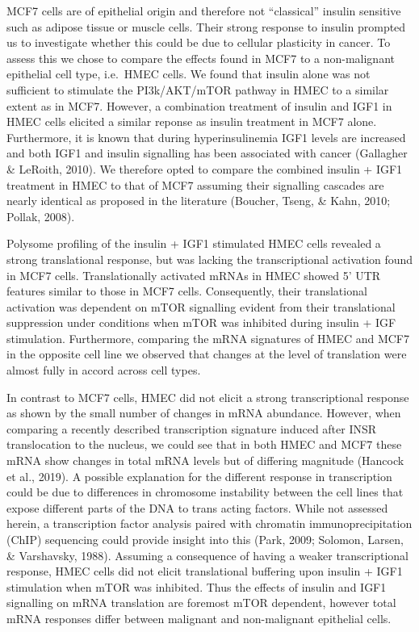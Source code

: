 \documentclass[
  12pt,
  openany]{book}
\begin{document}
MCF7 cells are of epithelial origin and therefore not ``classical'' insulin sensitive such as adipose tissue or muscle cells. Their strong response to insulin prompted us to investigate whether this could be due to cellular plasticity in cancer. To assess this we chose to compare the effects found in MCF7 to a non-malignant epithelial cell type, i.e.~HMEC cells. We found that insulin alone was not sufficient to stimulate the PI3k/AKT/mTOR pathway in HMEC to a similar extent as in MCF7. However, a combination treatment of insulin and IGF1 in HMEC cells elicited a similar reponse as insulin treatment in MCF7 alone. Furthermore, it is known that during hyperinsulinemia IGF1 levels are increased and both IGF1 and insulin signalling has been associated with cancer (Gallagher \& LeRoith, 2010). We therefore opted to compare the combined insulin + IGF1 treatment in HMEC to that of MCF7 assuming their signalling cascades are nearly identical as proposed in the literature (Boucher, Tseng, \& Kahn, 2010; Pollak, 2008).

Polysome profiling of the insulin + IGF1 stimulated HMEC cells revealed a strong translational response, but was lacking the transcriptional activation found in MCF7 cells. Translationally activated mRNAs in HMEC showed 5' UTR features similar to those in MCF7 cells. Consequently, their translational activation was dependent on mTOR signalling evident from their translational suppression under conditions when mTOR was inhibited during insulin + IGF stimulation. Furthermore, comparing the mRNA signatures of HMEC and MCF7 in the opposite cell line we observed that changes at the level of translation were almost fully in accord across cell types.

In contrast to MCF7 cells, HMEC did not elicit a strong transcriptional response as shown by the small number of changes in mRNA abundance. However, when comparing a recently described transcription signature induced after INSR translocation to the nucleus, we could see that in both HMEC and MCF7 these mRNA show changes in total mRNA levels but of differing magnitude (Hancock et al., 2019). A possible explanation for the different response in transcription could be due to differences in chromosome instability between the cell lines that expose different parts of the DNA to trans acting factors. While not assessed herein, a transcription factor analysis paired with chromatin immunoprecipitation (ChIP) sequencing could provide insight into this (Park, 2009; Solomon, Larsen, \& Varshavsky, 1988). Assuming a consequence of having a weaker transcriptional response, HMEC cells did not elicit translational buffering upon insulin + IGF1 stimulation when mTOR was inhibited. Thus the effects of insulin and IGF1 signalling on mRNA translation are foremost mTOR dependent, however total mRNA responses differ between malignant and non-malignant epithelial cells.
\end{document}
